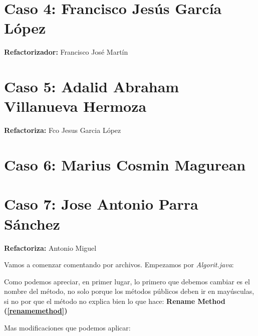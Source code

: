 \documentclass[11pt,a4paper,oneside]{book}
\begin{document}
    
    
    


\chapter {Caso 4: Francisco Jesús García López}
\textbf{Refactorizador:} Francisco José Martín







\chapter {Caso 5: Adalid Abraham Villanueva Hermoza}
\textbf{Refactoriza:} Fco Jesus Garcia López


\chapter {Caso 6: Marius Cosmin Magurean}

\chapter {Caso 7: Jose Antonio Parra Sánchez}
\textbf{Refactoriza:} Antonio Miguel

Vamos a comenzar comentando por archivos.
Empezamos por \emph{Algorit.java}:



Como podemos apreciar, en primer lugar, lo primero que debemos cambiar es el nombre del método, no solo porque los métodos públicos deben ir en mayúsculas, si no por que el método no explica bien lo que hace: \textbf{Rename Method (\ref{renamemethod})}

\newline
Mas modificaciones que podemos aplicar:
\end{document}
